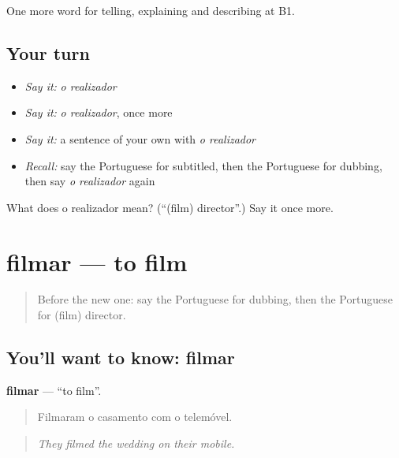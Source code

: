 \begin{grammarlens}[title={What you've built}]
One more word for telling, explaining and describing at B1.
\end{grammarlens}

\subsection*{Your turn}
\begin{itemize}
\raggedright
  \item \emph{Say it:} \emph{o realizador}
  \item \emph{Say it:} \emph{o realizador}, once more
  \item \emph{Say it:} a sentence of your own with \emph{o realizador}
  \item \emph{Recall:} say the Portuguese for subtitled, then the Portuguese for dubbing, then say \emph{o realizador} again
\end{itemize}

\begin{tcolorbox}[breakable,colback=teal!4,colframe=teal!35!black,title={Before you move on}]
What does o realizador mean? (\textquotedblleft{}(film) director\textquotedblright{}.) Say it once more.
\end{tcolorbox}
\section[filmar]{filmar — to film}

\label{lesson:PT-C527-filmar}



\begin{quote}
Before the new one: say the Portuguese for dubbing, then the Portuguese for (film) director.
\end{quote}

\subsection*{You'll want to know: filmar}
\textbf{filmar} — \textquotedblleft{}to film\textquotedblright{}.

\begin{quote}
Filmaram o casamento com o telemóvel.
\end{quote}

\begin{quote}
\emph{They filmed the wedding on their mobile.}
\end{quote}

